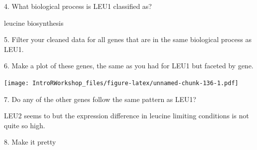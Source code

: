 \documentclass[]{book}
\newenvironment{Shaded}{\begin{snugshade}}{\end{snugshade}}
\newcommand{\DataTypeTok}[1]{\textcolor[rgb]{0.13,0.29,0.53}{#1}}
\newcommand{\KeywordTok}[1]{\textcolor[rgb]{0.13,0.29,0.53}{\textbf{#1}}}
\newcommand{\NormalTok}[1]{#1}
\newcommand{\OperatorTok}[1]{\textcolor[rgb]{0.81,0.36,0.00}{\textbf{#1}}}
\newcommand{\StringTok}[1]{\textcolor[rgb]{0.31,0.60,0.02}{#1}}
\begin{document}
4. What biological process is LEU1 classified as?

leucine biosynthesis

5. Filter your cleaned data for all genes that are in the same biological process as LEU1.

\begin{Shaded}
\end{Shaded}

6. Make a plot of these genes, the same as you had for LEU1 but faceted by gene.

\begin{Shaded}
\end{Shaded}

\texttt{[image: IntroRWorkshop\_files/figure-latex/unnamed-chunk-136-1.pdf]}

7. Do any of the other genes follow the same pattern as LEU1?

LEU2 seems to but the expression difference in leucine limiting conditions is not quite so high.

8. Make it pretty
\end{document}
